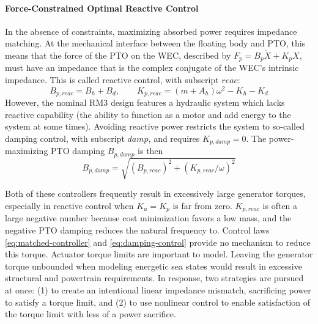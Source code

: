 \paragraph{Force-Constrained Optimal Reactive Control}
In the absence of constraints, maximizing absorbed power requires impedance matching.
At the mechanical interface between the floating body and PTO, this means that the force of the PTO on the WEC, described by $F_{p} = B_{p}\dot{X} + K_{p}X$, must have an impedance that is the complex conjugate of the WEC's intrinsic impedance.
This is called reactive control, with subscript $reac$:
\begin{equation}\label{eq:matched-controller}
	B_{p,reac} = B_h + B_d, \qquad K_{p,reac} = (m+A_h) \omega^2 - K_h - K_d
\end{equation}
However, the nominal RM3 design features a hydraulic system which lacks reactive capability (the ability to function as a motor and add energy to the system at some times).
Avoiding reactive power restricts the system to so-called damping control, with subscript $damp$, and requires $K_{p,damp}=0$.
The power-maximizing PTO damping $B_{p,damp}$ is then
\begin{equation}\label{eq:damping-control}
    B_{p,damp} = \sqrt{ (B_{p,reac})^2 + (K_{p,reac}/\omega)^2}
\end{equation}

Both of these controllers frequently result in excessively large generator torques, especially in reactive control when $K_u=K_p$ is far from zero. $K_{p,reac}$ is often a large negative number because cost minimization favors a low mass, and the negative PTO damping reduces the natural frequency to.
Control laws \eqref{eq:matched-controller} and \eqref{eq:damping-control} provide no mechanism to reduce this torque.
Actuator torque limits are important to model.
Leaving the generator torque unbounded when modeling energetic sea states would result in excessive structural and powertrain requirements.
In response, two strategies are pursued at once: (1) to create an intentional linear impedance mismatch, sacrificing power to satisfy a torque limit, and (2) to use nonlinear control to enable satisfaction of the torque limit with less of a power sacrifice.

